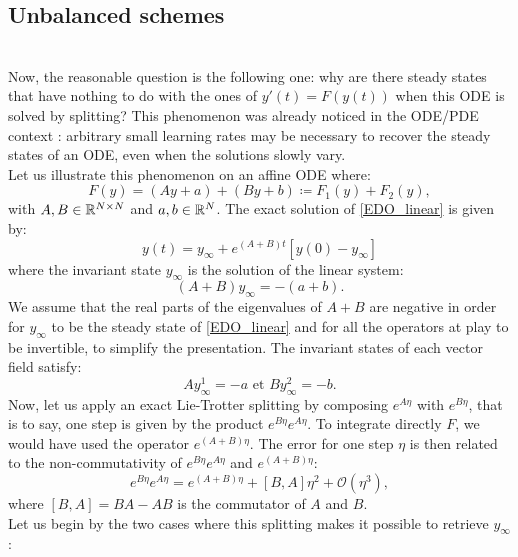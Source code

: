 \documentclass[article,authoryear,jmlmc]{beg_32}             %
\begin{document}
\subsection{Unbalanced schemes}
~~\\
Now, the reasonable question is the following one: why are there steady states that have nothing to do with the ones of $y'(t)=F(y(t))$ when this ODE is solved by splitting? This phenomenon was already noticed in the ODE/PDE context \cite{rebalanced_splitting}: arbitrary small learning rates may be necessary to recover the steady states of an ODE, even when the solutions slowly vary. \\
Let us illustrate this phenomenon on an affine ODE where:
\begin{equation}
	F(y) = \left(Ay+a\right) + \left(By+b\right) \coloneqq F_1(y) + F_2(y),
	\label{EDO_linear}
\end{equation}
with $A,B \in \mathbb{R}^{N \times N}$ and $a,b \in \mathbb{R}^N$. The exact solution of \eqref{EDO_linear} is given by:
\begin{equation*}
	y(t) = y_{\infty} + e^{(A+B)t}\left[y(0)-y_{\infty}\right]
\end{equation*}
where the invariant state $y_{\infty}$ is the solution of the linear system:
\begin{equation*}
	(A+B)y_{\infty} = -(a+b).
\end{equation*}
We assume that the real parts of the eigenvalues of $A+B$ are negative in order for $y_{\infty}$ to be the steady state of \eqref{EDO_linear} and for all the operators at play to be invertible, to simplify the presentation. The invariant states of each vector field satisfy:
\begin{equation*}
	Ay_{\infty}^1 = -a \text{ et } By_{\infty}^2 = -b.
\end{equation*}
Now, let us apply an exact Lie-Trotter splitting by composing $e^{A\eta}$ with $e^{B\eta}$, that is to say, one step is given by the product $e^{B\eta}e^{A\eta}$. To integrate
directly $F$, we would have used the operator $e^{(A+B)\eta}$. The error for one step $\eta$ is then related to the non-commutativity of $e^{B\eta}e^{A\eta}$ and $e^{(A+B)\eta}$:
\begin{equation}
	e^{B\eta}e^{A\eta} = e^{(A+B)\eta} + \left[B,A\right]\eta^2 + \mathcal{O}(\eta^3),
	\label{Taylor_split}
\end{equation}
where $\left[B,A\right]=BA-AB$ is the commutator of $A$ and $B$.\\
Let us begin by the two cases where this splitting makes it possible to retrieve $y_{\infty}$:
\end{document}
